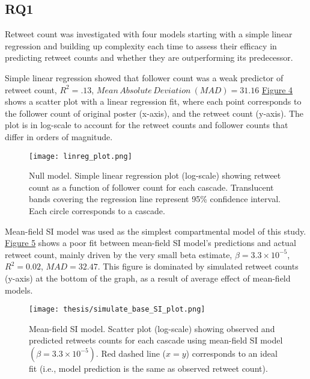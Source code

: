 \documentclass[11pt,a4paper]{article}
\begin{document}
    \subsection{RQ1}
    Retweet count was investigated with four models starting with a simple linear regression and building up complexity each time to assess their efficacy in predicting retweet counts and whether they are outperforming its predecessor.
        
    Simple linear regression showed that follower count was a weak predictor of retweet count, $R^2 = .13$, 
    $Mean \, Absolute \, Deviation \ (MAD) = 31.16$ \hyperlink{fig:null-model}{Figure 4} shows a scatter plot with a linear regression fit, where each point corresponds to the follower count of original poster (x-axis), and the retweet count (y-axis). The plot is in log-scale to account for the retweet counts and follower counts that differ in orders of magnitude.

    \begin{figure}[H]
        \hypertarget{fig:null-model}{}
        \centering
        \texttt{[image: linreg\_plot.png]}\\
        \caption{Null model. Simple linear regression plot (log-scale) showing retweet count as a function of follower count for each cascade. Translucent bands covering the regression line represent 95\% confidence interval. Each circle corresponds to a cascade.}    
        \label{fig:enter-label}
    \end{figure}

    Mean-field SI model was used as the simplest compartmental model of this study. \hyperlink{fig:base-SI}{Figure 5} shows a poor fit between mean-field SI model's predictions and actual retweet count, mainly driven by the very small beta estimate, $\beta = 3.3 \times 10^{-5}$, $R^2 = 0.02$, $MAD = 32.47$. This figure is dominated by simulated retweet counts (y-axis) at the bottom of the graph, as a result of average effect of mean-field models.
    
    \begin{figure}[H]
        \hypertarget{fig:base-SI}{}
        \centering
        \texttt{[image: thesis/simulate\_base\_SI\_plot.png]}\\
        \caption{Mean-field SI model. Scatter plot (log-scale) showing observed and predicted retweets counts for each cascade using mean-field SI model $(\beta = 3.3 \times 10^{-5})$. Red dashed line ($x=y$) corresponds to an ideal fit (i.e., model prediction is the same as observed retweet count).}
        \label{fig:enter-label}
    \end{figure}
    
\end{document}
